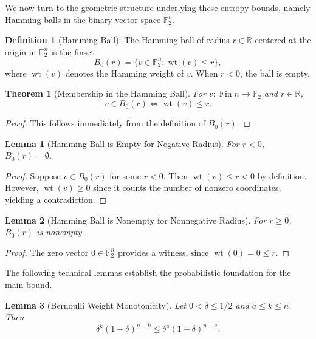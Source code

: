 \documentclass[11pt]{article}
\theoremstyle{plain}
\newtheorem*{theorem}{Theorem}
\newtheorem*{lemma}{Lemma}
\theoremstyle{definition}
\newtheorem*{definition}{Definition}
\theoremstyle{remark}
\begin{document}
We now turn to the geometric structure underlying these entropy bounds, namely Hamming balls in the binary vector space $\mathbb{F}_2^n$.

\begin{definition}[Hamming Ball]
The Hamming ball of radius $r \in \mathbb{R}$ centered at the origin in $\mathbb{F}_2^n$ is the finset
\[
B_0(r) = \{ v \in \mathbb{F}_2^n : \operatorname{wt}(v) \leq r \},
\]
where $\operatorname{wt}(v)$ denotes the Hamming weight of $v$. When $r < 0$, the ball is empty.
\end{definition}

\begin{theorem}[Membership in the Hamming Ball]
For $v : \operatorname{Fin} n \to \mathbb{F}_2$ and $r \in \mathbb{R}$,
\[
v \in B_0(r) \iff \operatorname{wt}(v) \leq r.
\]
\end{theorem}

\begin{proof}
This follows immediately from the definition of $B_0(r)$.
\end{proof}

\begin{lemma}[Hamming Ball is Empty for Negative Radius]
For $r < 0$, $B_0(r) = \emptyset$.
\end{lemma}

\begin{proof}
Suppose $v \in B_0(r)$ for some $r < 0$. Then $\operatorname{wt}(v) \leq r < 0$ by definition. However, $\operatorname{wt}(v) \geq 0$ since it counts the number of nonzero coordinates, yielding a contradiction.
\end{proof}

\begin{lemma}[Hamming Ball is Nonempty for Nonnegative Radius]
For $r \geq 0$, $B_0(r)$ is nonempty.
\end{lemma}

\begin{proof}
The zero vector $0 \in \mathbb{F}_2^n$ provides a witness, since $\operatorname{wt}(0) = 0 \leq r$.
\end{proof}

The following technical lemmas establish the probabilistic foundation for the main bound.

\begin{lemma}[Bernoulli Weight Monotonicity]
Let $0 < \delta \leq 1/2$ and $a \leq k \leq n$. Then
\[
\delta^k (1-\delta)^{n-k} \leq \delta^a (1-\delta)^{n-a}.
\]
\end{lemma}
\end{document}
